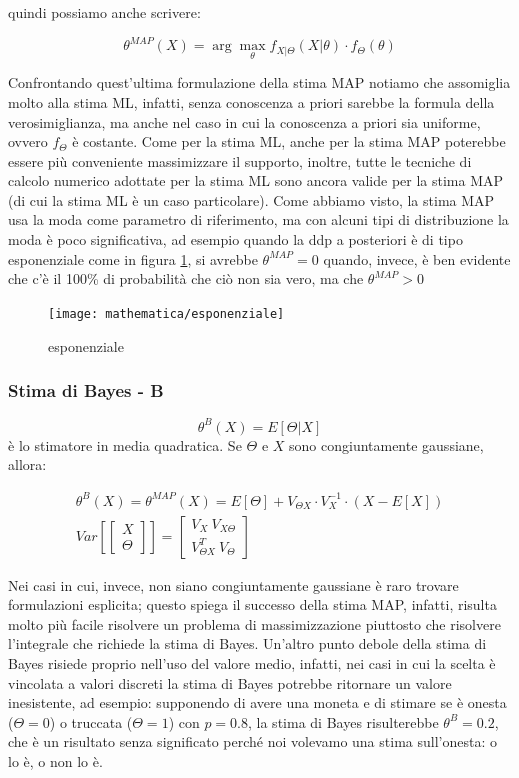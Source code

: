 quindi possiamo anche scrivere:

  \[ \theta^{MAP}(X)=\arg \max_\theta f_{X|\Theta}(X|\theta) \cdot f_\Theta(\theta) \]
  
Confrontando quest'ultima formulazione della stima MAP notiamo che assomiglia molto alla stima ML, infatti, senza conoscenza a priori sarebbe la formula della verosimiglianza, ma anche nel caso in cui la conoscenza a priori sia uniforme, ovvero $f_\Theta$ è costante.\newline
Come per la stima ML, anche per la stima MAP poterebbe essere più conveniente massimizzare il supporto, inoltre, tutte le tecniche di calcolo numerico adottate per la stima ML sono ancora valide per la stima MAP (di cui la stima ML è un caso particolare).
Come abbiamo visto, la stima MAP usa la moda come parametro di riferimento, ma con alcuni tipi di distribuzione la moda è poco significativa, ad esempio quando la ddp a posteriori è di tipo esponenziale come in figura \ref{fig:expMAP}, si avrebbe $\theta^{MAP}=0$ quando, invece, è ben evidente che c'è il 100\% di probabilità che ciò non sia vero, ma che $\theta^{MAP}>0$

\begin{figure}[htbp]
  \centering
  \texttt{[image: mathematica/esponenziale]}
  \caption{esponenziale\label{fig:expMAP}}
\end{figure}


\subsubsection{Stima di Bayes - B} %
  \[ \theta^B(X)=E[\Theta|X] \]
è lo stimatore in media quadratica. Se $\Theta$ e $X$ sono congiuntamente gaussiane, allora:

  \begin{gather*}
    \theta^B(X)=\theta^{MAP}(X)=E[\Theta]+V_{\Theta X} \cdot V_X^{-1} \cdot (X-E[X])\\
    Var \left[\begin{bmatrix} X \\ \Theta \end{bmatrix} \right]=\begin{bmatrix} V_X \ V_{X\Theta} \\ V_{\Theta X}^T \ V_\Theta \end{bmatrix}
  \end{gather*}
  
Nei casi in cui, invece, non siano congiuntamente gaussiane è raro trovare formulazioni esplicita; questo spiega il successo della stima MAP, infatti, risulta molto più facile risolvere un problema di massimizzazione piuttosto che risolvere l'integrale che richiede la stima di Bayes. Un'altro punto debole della stima di Bayes risiede proprio nell'uso del valore medio, infatti, nei casi in cui la scelta è vincolata a valori discreti la stima di Bayes potrebbe ritornare un valore inesistente, ad esempio: supponendo di avere una moneta e di stimare se è onesta ($\Theta=0$) o truccata ($\Theta=1$) con $p=0.8$, la stima di Bayes risulterebbe $\theta^B=0.2$, che è un risultato senza significato perché noi volevamo una stima sull'onesta: o lo è, o non lo è.
